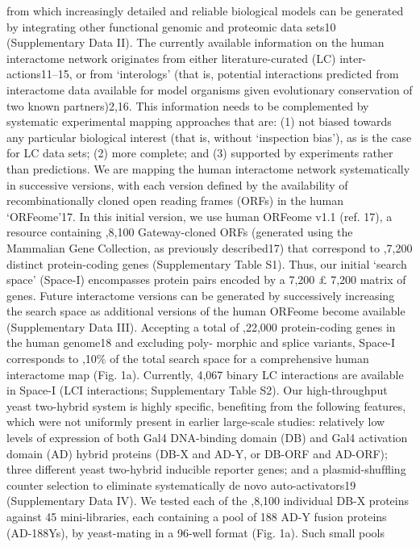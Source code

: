from which increasingly detailed and reliable biological models can
be generated by integrating other functional genomic and proteomic
data sets10 (Supplementary Data II).
The currently available information on the human interactome
network originates from either literature-curated (LC) inter-
actions11–15, or from ‘interologs’ (that is, potential interactions
predicted from interactome data available for model organisms
given evolutionary conservation of two known partners)2,16. This
information needs to be complemented by systematic experimental
mapping approaches that are: (1) not biased towards any particular
biological interest (that is, without ‘inspection bias’), as is the case for
LC data sets; (2) more complete; and (3) supported by experiments
rather than predictions. We are mapping the human interactome
network systematically in successive versions, with each version
deﬁned by the availability of recombinationally cloned open reading
frames (ORFs) in the human ‘ORFeome’17.
In this initial version, we use human ORFeome v1.1 (ref. 17), a
resource containing ,8,100 Gateway-cloned ORFs (generated using
the Mammalian Gene Collection, as previously described17) that
correspond to ,7,200 distinct protein-coding genes (Supplementary
Table S1). Thus, our initial ‘search space’ (Space-I) encompasses
protein pairs encoded by a 7,200 £ 7,200 matrix of genes. Future
interactome versions can be generated by successively increasing the
search space as additional versions of the human ORFeome become
available (Supplementary Data III). Accepting a total of ,22,000
protein-coding genes in the human genome18 and excluding poly-
morphic and splice variants, Space-I corresponds to ,10\% of the
total search space for a comprehensive human interactome map
(Fig. 1a). Currently, 4,067 binary LC interactions are available in
Space-I (LCI interactions; Supplementary Table S2).
Our high-throughput yeast two-hybrid system is highly speciﬁc,
beneﬁting from the following features, which were not uniformly
present in earlier large-scale studies: relatively low levels of expression
of both Gal4 DNA-binding domain (DB) and Gal4 activation
domain (AD) hybrid proteins (DB-X and AD-Y, or DB-ORF and
AD-ORF); three different yeast two-hybrid inducible reporter genes;
and a plasmid-shufﬂing counter selection to eliminate systematically
de novo auto-activators19 (Supplementary Data IV). We tested each of
the ,8,100 individual DB-X proteins against 45 mini-libraries, each
containing a pool of 188 AD-Y fusion proteins (AD-188Ys), by
yeast-mating in a 96-well format (Fig. 1a). Such small pools
